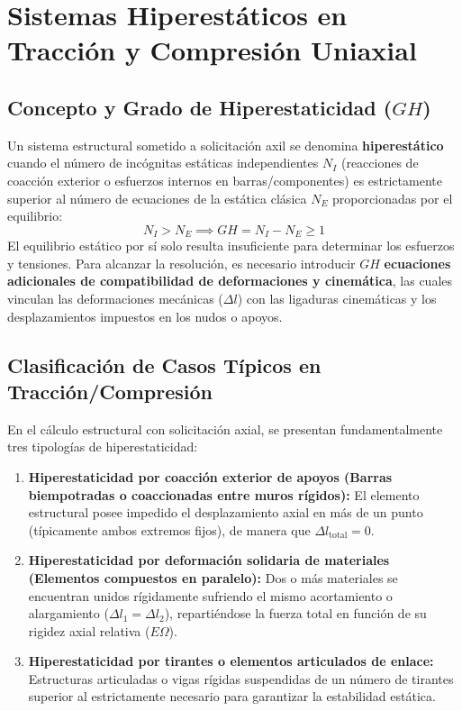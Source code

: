 \section{Sistemas Hiperestáticos en Tracción y Compresión Uniaxial}

\subsection{Concepto y Grado de Hiperestaticidad ($GH$)}
Un sistema estructural sometido a solicitación axil se denomina \textbf{hiperestático} cuando el número de incógnitas estáticas independientes $N_I$ (reacciones de coacción exterior o esfuerzos internos en barras/componentes) es estrictamente superior al número de ecuaciones de la estática clásica $N_E$ proporcionadas por el equilibrio:
\begin{equation}
    N_I > N_E \implies GH = N_I - N_E \ge 1
\end{equation}
El equilibrio estático por sí solo resulta insuficiente para determinar los esfuerzos y tensiones. Para alcanzar la resolución, es necesario introducir $GH$ \textbf{ecuaciones adicionales de compatibilidad de deformaciones y cinemática}, las cuales vinculan las deformaciones mecánicas ($\Delta l$) con las ligaduras cinemáticas y los desplazamientos impuestos en los nudos o apoyos.

\subsection{Clasificación de Casos Típicos en Tracción/Compresión}
En el cálculo estructural con solicitación axial, se presentan fundamentalmente tres tipologías de hiperestaticidad:
\begin{enumerate}
    \item \textbf{Hiperestaticidad por coacción exterior de apoyos (Barras biempotradas o coaccionadas entre muros rígidos):}
          El elemento estructural posee impedido el desplazamiento axial en más de un punto (típicamente ambos extremos fijos), de manera que $\Delta l_{\text{total}} = 0$.
    \item \textbf{Hiperestaticidad por deformación solidaria de materiales (Elementos compuestos en paralelo):}
          Dos o más materiales se encuentran unidos rígidamente sufriendo el mismo acortamiento o alargamiento ($\Delta l_1 = \Delta l_2$), repartiéndose la fuerza total en función de su rigidez axial relativa ($E\Omega$).
    \item \textbf{Hiperestaticidad por tirantes o elementos articulados de enlace:}
          Estructuras articuladas o vigas rígidas suspendidas de un número de tirantes superior al estrictamente necesario para garantizar la estabilidad estática.
\end{enumerate}

